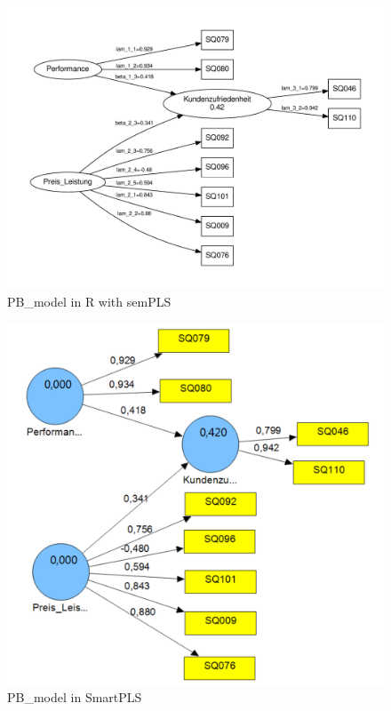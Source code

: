 \documentclass{article}\usepackage[]{graphicx}\usepackage[]{color}
\begin{document}
\begin{figure}[h!]
\centering
\hspace*{-3cm}\includegraphics[scale=0.8]{PB-structure.pdf}
\caption{PB\_model in R with semPLS}
\label{PB_model_R}
\end{figure}

\begin{figure}[h!]
\centering
\hspace*{-2cm}\includegraphics[scale=0.6]{figure/PB_model_smartpls.pdf}
\caption{PB\_model in SmartPLS}
\label{PB_model_smartpls}
\end{figure}
\end{document}
